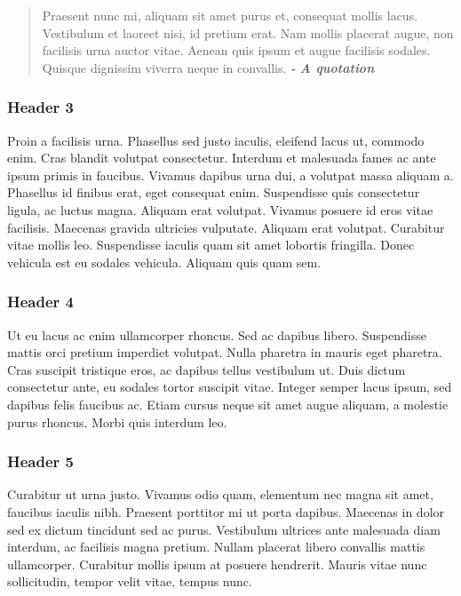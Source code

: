 \documentclass{article}
\begin{document}
\begin{quote}



Praesent nunc mi, aliquam sit amet purus et, consequat mollis lacus. Vestibulum et laoreet nisi, id pretium erat. Nam mollis placerat augue, non facilisis urna auctor vitae. Aenean quis ipsum et augue facilisis sodales. Quisque dignissim viverra neque in convallis. \emph{\textbf{-}} \emph{\textbf{A quotation}}


\end{quote}


\subsubsection{Header 3}\label{H940055}



Proin a facilisis urna. Phasellus sed justo iaculis, eleifend lacus ut, commodo enim. Cras blandit volutpat consectetur. Interdum et malesuada fames ac ante ipsum primis in faucibus. Vivamus dapibus urna dui, a volutpat massa aliquam a. Phasellus id finibus erat, eget consequat enim. Suspendisse quis consectetur ligula, ac luctus magna. Aliquam erat volutpat. Vivamus posuere id eros vitae facilisis. Maecenas gravida ultricies vulputate. Aliquam erat volutpat. Curabitur vitae mollis leo. Suspendisse iaculis quam sit amet lobortis fringilla. Donec vehicula est eu sodales vehicula. Aliquam quis quam sem.


\subsubsection{Header 4}\label{H1559559}



Ut eu lacus ac enim ullamcorper rhoncus. Sed ac dapibus libero. Suspendisse mattis orci pretium imperdiet volutpat. Nulla pharetra in mauris eget pharetra. Cras suscipit tristique eros, ac dapibus tellus vestibulum ut. Duis dictum consectetur ante, eu sodales tortor suscipit vitae. Integer semper lacus ipsum, sed dapibus felis faucibus ac. Etiam cursus neque sit amet augue aliquam, a molestie purus rhoncus. Morbi quis interdum leo.


\subsubsection{Header 5}\label{H7046962}



Curabitur ut urna justo. Vivamus odio quam, elementum nec magna sit amet, faucibus iaculis nibh. Praesent porttitor mi ut porta dapibus. Maecenas in dolor sed ex dictum tincidunt sed ac purus. Vestibulum ultrices ante malesuada diam interdum, ac facilisis magna pretium. Nullam placerat libero convallis mattis ullamcorper. Curabitur mollis ipsum at posuere hendrerit. Mauris vitae nunc sollicitudin, tempor velit vitae, tempus nunc.
\end{document}
